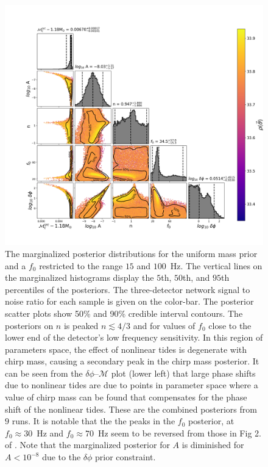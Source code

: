 \begin{figure}
\includegraphics[width=\textwidth]{figs/chapter6/combined_uni_dphi_cut_combined.png}
\caption{The marginalized posterior distributions for the uniform mass prior and a $f_0$ restricted to the range $15$ and $100$~Hz. The vertical lines on the marginalized histograms display the $5$th, $50$th, and $95$th percentiles of the posteriors. The three-detector network signal to noise ratio for each sample is given on the color-bar. The posterior scatter plots show 50\% and 90\% credible interval contours. The posteriors on $n$ is peaked $n \lesssim 4/3$ and for values of $f_0$ close to the lower end of the detector's low frequency sensitivity. In this region of parameters space, the effect of nonlinear tides is degenerate with chirp mass, causing a secondary peak in the chirp mass posterior. It can be seen from the $\delta\phi$--$\mathcal{M}$ plot (lower left) that large phase shifts due to nonlinear tides are due to points in parameter space where a value of chirp mass can be found that compensates for the phase shift of the nonlinear tides. These are the combined posteriors from $9$ runs. It is notable that the the peaks in the $f_0$ posterior, at $f_0 \approx 30$~Hz and $f_0 \approx 70$~Hz seem to be reversed from those in Fig 2. of \citep{abbott2019constraining}. Note that the marginalized posterior for $A$ is diminished for $A < 10^{-8}$ due to the $\delta \phi$ prior constraint.}
\label{fig:uniform_f0_small}
\end{figure}

